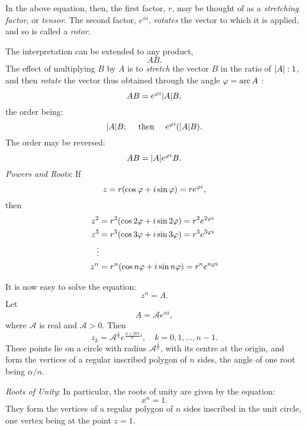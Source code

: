 In the above equation, then, the first factor, $r$, may be thought of as a \emph{stretching factor}, or \emph{tensor}. The second factor, $e^{\phi i}$, \emph{rotates} the vector to which it is applied, and so is called a \emph{rotor}. 

The interpretation can be extended to any product,
\[
AB
.\] The effect of multiplying $B$ by $A$ is to \emph{stretch} the vector $B$ in the ratio of $\abs*{A} :1$, and then \emph{rotate} the vector thus obtained through the angle $\phi =\Arc A$ :
\[
AB=e^{\phi i}\abs*{A} B
,\] the order being:
\[
	\abs*{A} B; \quad \text{ then } \quad e^{\phi i}\pbr*{\abs*{A} B} 
.\] The order may be reversed:
\[
AB=\abs*{A} e^{\phi i}B
.\] \emph{Powers and Roots}: If
\[
	z=r\pbr*{\cos \phi +i\sin \phi } =r e^{\phi i}
,\] then
\begin{align*}
	z^2&=r^2\pbr*{\cos 2\phi +i\sin 2\phi } =r^2 e^{2\phi i}\\
	z^3&=r^3\pbr*{\cos 3\phi +i\sin 3\phi } =r^3e^{3\phi i}\\
	\vdots&\\
	z^n&= r^n \pbr*{\cos n\phi +i\sin n\phi } =r^ne^{n\phi i}
\end{align*}

It is now easy to solve the equation:
\[
z^n=A
.\] Let
\[
	A=\mathcal{A} e^{\alpha i}
,\] where $\mathcal{A} $ is real and $\mathcal{A} >0$. Then
\[
	z_k=\mathcal{A} ^{\frac{1}{n}} e^{\frac{\alpha +2k\pi }{n} i}, \quad k=0,1, \dots , n-1
.\] These points lie on a circle with radius $\mathcal{A}^{\frac{1}{n}}$, with its centre at the origin, and form the vertices of a regular inscribed polygon of $n$ sides, the angle of one root being $\alpha /n$. 

\emph{Roots of Unity}: In particular, the roots of unity are given by the equation:
\[
x^n=1
.\] They form the vertices of a regular polygon of $n$ sides inscribed in the unit circle, one vertex being at the point $z=1$.

\newdimen\R
\R=0.8cm
\begin{figure}[htbp]
\centering
{}
\end{figure}

